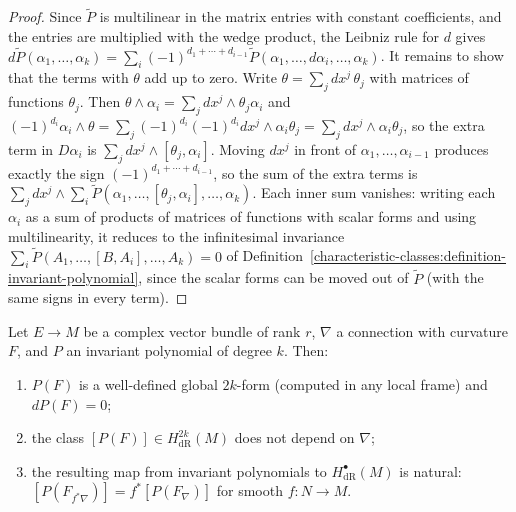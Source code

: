 \begin{proof}
Since $\tilde P$ is multilinear in the matrix entries with constant coefficients, and the entries are multiplied with the wedge product, the Leibniz rule for $d$ gives
$d\tilde P(\alpha_1, \ldots, \alpha_k) = \sum_i(-1)^{d_1 + \cdots + d_{i-1}}\tilde P(\alpha_1, \ldots, d\alpha_i, \ldots, \alpha_k)$. It remains to show that the terms with $\theta$ add up to zero.
Write $\theta = \sum_jdx^j\,\theta_j$ with matrices of functions $\theta_j$. Then $\theta \wedge \alpha_i = \sum_jdx^j \wedge \theta_j\alpha_i$ and
$(-1)^{d_i}\alpha_i \wedge \theta = \sum_j(-1)^{d_i}(-1)^{d_i}dx^j \wedge \alpha_i\theta_j = \sum_jdx^j \wedge \alpha_i\theta_j$, so the extra term in $D\alpha_i$ is $\sum_jdx^j \wedge [\theta_j, \alpha_i]$. Moving
$dx^j$ in front of $\alpha_1, \ldots, \alpha_{i-1}$ produces exactly the sign $(-1)^{d_1 + \cdots + d_{i-1}}$, so the sum of the extra terms is
$\sum_jdx^j \wedge \sum_i\tilde P(\alpha_1, \ldots, [\theta_j, \alpha_i], \ldots, \alpha_k)$. Each inner sum vanishes: writing each $\alpha_i$ as a sum of products of matrices of functions with
scalar forms and using multilinearity, it reduces to the infinitesimal invariance $\sum_i\tilde P(A_1, \ldots, [B, A_i], \ldots, A_k) = 0$ of
Definition~\ref{characteristic-classes:definition-invariant-polynomial}, since the scalar forms can be moved out of $\tilde P$ (with the same signs in every term).
\end{proof}

\begin{theorem}\label{characteristic-classes:theorem-chern-weil}
Let $E \to M$ be a complex vector bundle of rank $r$, $\nabla$ a connection with curvature $F$, and $P$ an invariant polynomial of degree $k$. Then:
\begin{enumerate}
\item $P(F)$ is a well-defined global $2k$-form (computed in any local frame) and $dP(F) = 0$;
\item the class $[P(F)] \in H^{2k}_{\mathrm{dR}}(M)$ does not depend on $\nabla$;
\item the resulting map from invariant polynomials to $H^\bullet_{\mathrm{dR}}(M)$ is natural: $[P(F_{f^*\nabla})] = f^*[P(F_\nabla)]$ for smooth $f \colon N \to M$.
\end{enumerate}
\end{theorem}

